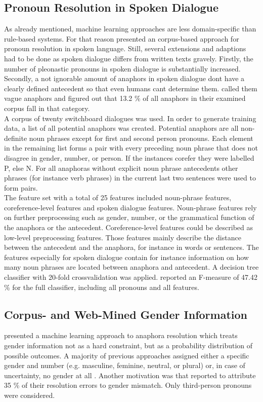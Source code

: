 \subsection{Pronoun Resolution in Spoken Dialogue}
As already mentioned, machine learning approaches are less domain-specific than rule-based systems. For that reason \citep{strube2003machine} presented an corpus-based approach for pronoun resolution in spoken language. Still, several extensions and adaptions had to be done as spoken dialogue differs from written texts gravely. Firstly, the number of pleonastic pronouns in spoken dialogue is substantially increased. Secondly, a not ignorable amount of anaphors in spoken dialogue dont have a clearly defined antecedent so that even humans cant determine them. \citep{eckert2000dialogue} called them vague anaphors and figured out that 13.2 \% of all anaphors in their examined corpus fall in that category.\\
A corpus of twenty switchboard dialogues was used. In order to generate training data, a list of all potential anaphors was created. Potential anaphors are all non-definite noun phrases except for first and second person pronouns. Each element in the remaining list forms a pair with every preceding noun phrase that does not disagree in gender, number, or person. If the instances corefer they were labelled P, else N. For all anaphoras without explicit noun phrase antecedents other phrases (for instance verb phrases) in the current last two sentences were used to form pairs. \\
The feature set with a total of 25 features included noun-phrase features, coreference-level features and spoken dialogue features. Noun-phrase features rely on further preprocessing such as gender, number, or the grammatical function of the anaphora or the antecedent. Coreference-level features could be described as low-level preprocessing features. Those features mainly describe the distance between the antecedent and the anaphora, for instance in words or sentences. The features especially for spoken dialogue contain for instance information on how many noun phrases are located between anaphora and antecedent.
A decision tree classifier with 20-fold crossvalidation was applied. \citep{strube2003machine} reported an F-measure of 47.42 \% for the full classifier, including all pronouns and all features. 


\subsection{Corpus- and Web-Mined Gender Information}
\cite{bergsma2005automatic} presented a machine learning approach to anaphora resolution which treats gender information not as a hard constraint, but as a probability distribution of possible outcomes. A majority of previous approaches assigned either a specific gender and number (e.g. masculine, feminine, neutral, or plural) or, in case of uncertainty, no gender at all \citep{soon2001machine, broscheit2010bart}. Another motivation was that \cite{kennedy1996anaphora} reported to attribute 35 \% of their resolution errors to gender mismatch. Only third-person pronouns were considered.

